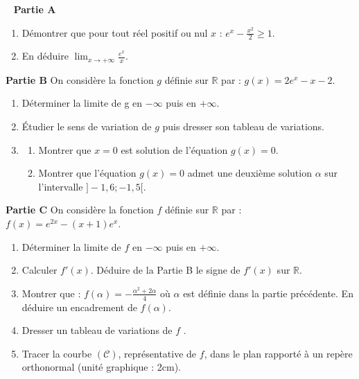 \begin{exo}
~ \newline
\textbf{Partie A} \newline
\begin{enumerate}
\item D\'emontrer que pour tout r\'eel positif ou nul $x$ : $ \displaystyle{ e^{x} - \frac{x^2}{2} \geq 1 }$.
\item En d\'eduire $\lim_{x \rightarrow + \infty} \frac{e^x}{x}$.
\end{enumerate}
\textbf{Partie B} \newline
On consid\`ere la fonction $g$ d\'efinie sur $\mathbb{R}$ par : $ \displaystyle{ g(x) = 2e^x - x - 2 }$.
\begin{enumerate}
\item D\'eterminer la limite de g en $- \infty$ puis en $+ \infty$.
\item \'Etudier le sens de variation de $g$ puis dresser son tableau de variations.
\item \begin{enumerate}
      \item Montrer que $x = 0$ est solution de l'\'equation $g(x) = 0$.
      \item Montrer que l'\'equation $g(x) = 0$ admet une deuxi\`eme solution $\alpha$ sur l'intervalle $]-1, 6 ; -1, 5[$.
      \end{enumerate}
\end{enumerate}
\textbf{Partie C} \newline
On consid\`ere la fonction $f$ d\'efinie sur $\mathbb{R}$ par : $ \displaystyle{  f(x) = e^{2x} - (x+1) e^x }$.
\begin{enumerate}
\item D\'eterminer la limite de $f$ en $- \infty$ puis en $+ \infty$.
\item Calculer $f'(x)$. D\'eduire de la {Partie B} le signe de $f'(x)$ sur $\mathbb{R}$.
\item Montrer que : 
      $ \displaystyle{ 
      f(\alpha) = - \frac{\alpha^2 + 2 \alpha}{4}
      }
      $
      o\`u $\alpha$ est d\'efinie dans la partie pr\'ec\'edente.
      En d\'eduire un encadrement de $f (\alpha)$.
\item Dresser un tableau de variations de $f$ .
\item Tracer la courbe $(\mathscr{C})$, repr\'esentative de $f$, dans le plan rapport\'e \`a un rep\`ere orthonormal (unit\'e graphique : 2cm).
\end{enumerate}
\end{exo}
